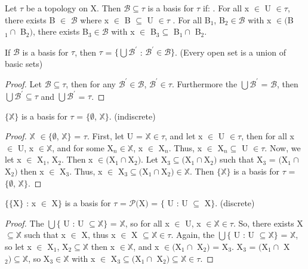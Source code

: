 \documentclass{article}
\begin{document}
	\begin{definition}
	Let $\tau$ be a topology on X. Then $\mathcal{B} \subseteq \tau$ is a basis for $\tau$ if:
	. For all x $\in$ U $\in \tau$, there exists B $\in$ $\mathcal{B}$ where x $\in$ B $\subseteq$ U $\in \tau$
	. For all B$_1$, B$_2 \in \mathcal{B}$ with x $\in ($B$_1 \cap$ B$_2)$, there exists B$_3 \in \mathcal{B}$ with x $\in$ B$_3 \subseteq$ B$_1 \cap$ B$_2$.
	\end{definition}

	\begin{theorem}
	If $\mathcal{B}$ is a basis for $\tau$, then $\tau$ = $\lbrace \bigcup \mathcal{B}^{'}$ : $\mathcal{B}^{'} \in \mathcal{B} \rbrace$. (Every open set is a union of basic sets)
	\end{theorem}
	\begin{proof}
	Let $\mathcal{B} \subseteq \tau$, then for any $\mathcal{B}^{'} \in \mathcal{B}$, $\mathcal{B}^{'} \in \tau$. Furthermore the $\bigcup \mathcal{B}^{'}$ = $\mathcal{B}$, then $\bigcup \mathcal{B}^{'} \subseteq \tau$ and $\bigcup \mathcal{B}^{'}$ = $\tau$.
	\end{proof}
	
	\begin{theorem}
	$\lbrace\mathbb{X}\rbrace$ is a basis for $\tau$ = $\lbrace\emptyset$, $\mathbb{X}\rbrace$. (indiscrete)
	\end{theorem}
	\begin{proof}
	$\mathbb{X}$ $\in \lbrace \emptyset$, $\mathbb{X}\rbrace$ = $\tau$. First, let U = $\mathbb{X} \in \tau$, and let x $\in$ U $\in \tau$, then for all x $\in$ U, x $\in \mathbb{X}$, and for some X$_n \in \mathbb{X}$, x $\in$ X$_n$. Thus, x $\in$ X$_n \subseteq$ U $\in \tau$. Now, we let x $\in$ X$_1$, X$_2$. Then x $\in ($X$_1 \cap $X$_2)$. Let X$_3 \subseteq ($X$_1 \cap $X$_2)$ such that X$_3$ = $($X$_1 \cap$ X$_2)$ then x $\in$ X$_3$. Thus, x $\in$ X$_3 \subseteq ($X$_1 \cap $X$_2) \in \mathbb{X}$. Then $\lbrace \mathbb{X} \rbrace$ is a basis for $\tau$ = $\lbrace \emptyset$, $\mathbb{X} \rbrace$.
	\end{proof}
	
	\begin{theorem}
	$\lbrace\lbrace$X$\rbrace$ : x $\in$ X$\rbrace$ is a basis for $\tau$ = $\mathcal{P}($X$)$ = $\lbrace$ U : U $\subseteq$ X$\rbrace$. (discrete)
	\end{theorem}
	\begin{proof}
	The $\bigcup \lbrace$ U : U $\subseteq \mathbb{X} \rbrace$ = $\mathbb{X}$, so for all x $\in$ U, x $\in \mathbb{X} \in \tau$. So, there exists X $\subseteq \mathbb{X}$ such that x $\in$ X, thus x $\in$ X $\subseteq \mathbb{X} \in \tau$. Again, the $\bigcup \lbrace$ U : U $\subseteq \mathbb{X} \rbrace$ = $\mathbb{X}$, so let x $\in$ X$_1$, X$_2 \subseteq \mathbb{X}$ then x $\in \mathbb{X}$, and x $\in ($X$_1 \cap$ X$_2)$ = X$_3$. X$_3$ = $($X$_1 \cap$ X$_2) \subseteq \mathbb{X}$, so X$_3 \in \mathbb{X}$ with x $\in$ X$_3 \subseteq ($X$_1 \cap$ X$_2) \subseteq \mathbb{X} \in \tau$.
	\end{proof}
	
\end{document}
